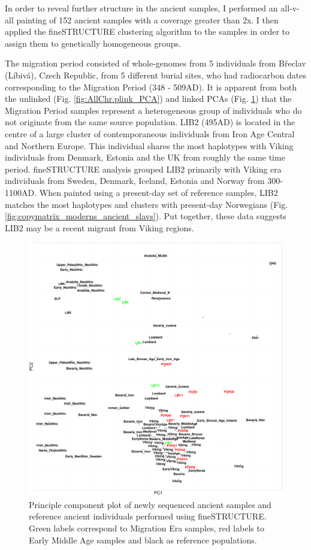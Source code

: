In order to reveal further structure in the ancient samples, I performed an all-v-all painting of 152 ancient samples with a coverage greater than 2x.  I then applied the fineSTRUCTURE clustering algorithm to the samples in order to assign them to genetically homogeneous groups.

The migration period consisted of whole-genomes from 5 individuals from Břeclav (Líbivá), Czech Republic, from 5 different burial sites, who had radiocarbon dates corresponding to the Migration Period (348 - 509AD). It is apparent from both the unlinked (Fig. \ref{fig:AllChr.plink_PCA}) and linked PCAs (Fig. \ref{fig:fs_PCA}) that the Migration Period samples represent a heterogeneous group of individuals who do not originate from the same source population. LIB2 (495AD) is located in the centre of a large cluster of contemporaneous individuals from Iron Age Central and Northern Europe. This individual shares the most haplotypes with Viking individuals from Denmark, Estonia and the UK from roughly the same time period. fineSTRUCTURE analysis grouped LIB2 primarily with Viking era individuals from Sweden, Denmark, Iceland, Estonia and Norway from 300-1100AD. When painted using a present-day set of reference samples, LIB2 matches the most haplotypes and clusters with present-day Norwegians (Fig. \ref{fig:copymatrix_moderns_ancient_slavs}). Put together, these data suggests LIB2 may be a recent migrant from Viking regions. 

\begin{figure}[htp]
    \centering
    \includegraphics[width=1.0\textwidth]{../images/chapter5/fs_PCA.pdf}
    \caption{Principle component plot of newly sequenced ancient samples and reference ancient individuals performed using fineSTRUCTURE. Green labels correspond to Migration Era samples, red labels to Early Middle Age samples and black as reference populations.}
    \label{fig:fs_PCA}
\end{figure}

